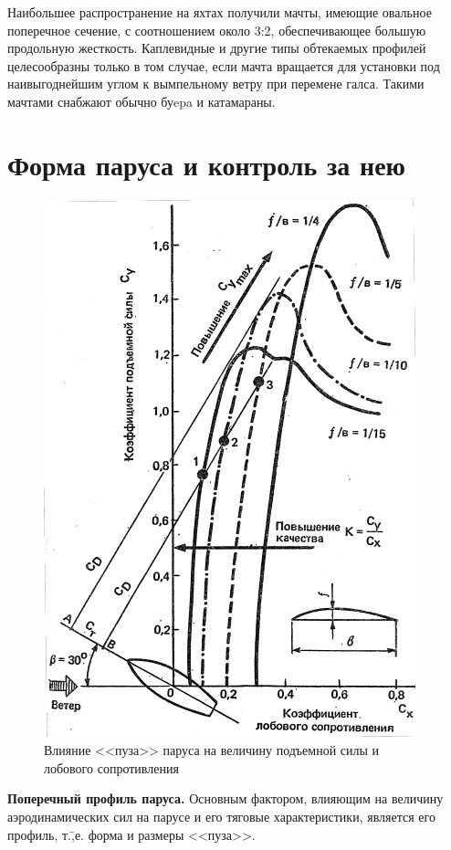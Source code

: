 \documentclass[a4paper, 12pt, twoside, final, book, russian, fittopage, cyremdash]{ncc}
\begin{document}
Наибольшее распространение на яхтах получили мачты, имеющие овальное поперечное сечение, с соотношением около 3:2, обеспечивающее большую продольную жесткость. Каплевидные и другие типы обтекаемых профилей целесообразны только в том случае, если мачта вращается для установки под наивыгоднейшим углом к вымпельному ветру при перемене галса. Такими мачтами снабжают обычно буepa и катамараны.

\section{Форма паруса и контроль за нею}

\begin{figure}[htb]
  \centering
  \includegraphics[scale=1.2]{0026P}
  \caption{Влияние <<пуза>> паруса на величину подъемной силы и лобового сопротивления}
  \label{fig:26}
\end{figure}

\textbf{Поперечный профиль паруса.} Основным фактором, влияющим на величину аэродинамических сил на парусе и его тяговые характеристики, является его профиль, т.\=,е. форма и размеры <<пуза>>.
\end{document}
